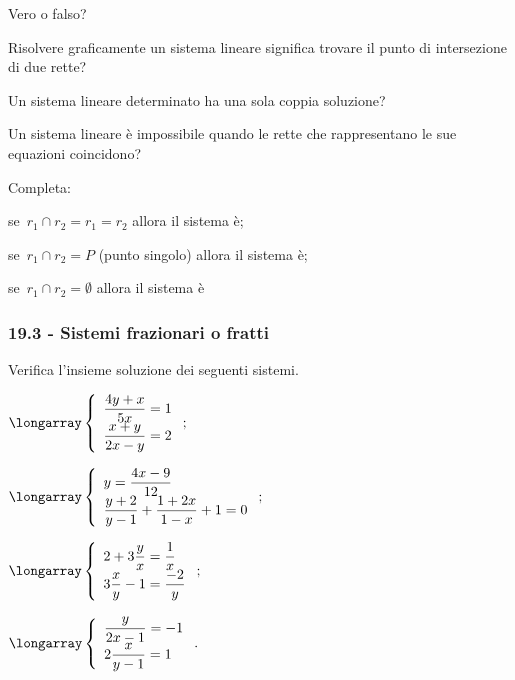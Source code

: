 \begin{esercizio}
 \label{ese:19.44}
Vero o falso?
\TabPositions{11cm}
 \begin{enumeratea}
\item Risolvere graficamente un sistema lineare significa trovare il punto di intersezione di due rette? \tab\boxV\quad\boxF
\item Un sistema lineare determinato ha una sola coppia soluzione?\tab\boxV\quad\boxF
\item Un sistema lineare è impossibile quando le rette che rappresentano le sue equazioni coincidono?\tab\boxV\quad\boxF
\end{enumeratea}
\end{esercizio}

\begin{esercizio}
 \label{ese:19.45}
Completa:

\begin{itemize*}
\item se~$r_{1}\cap r_{2}=r_{1}=r_{2}$ allora il sistema è\dotfill;
\item se~$r_{1}\cap r_{2}=P$ (punto singolo) allora il sistema è\dotfill;
\item se~$r_{1}\cap r_{2}=\emptyset $ allora il sistema è\dotfill
\end{itemize*}
\end{esercizio}
\pagebreak
\subsubsection*{19.3 - Sistemi frazionari o fratti}

\begin{esercizio}[\Ast]
 \label{ese:19.46}
Verifica l'insieme soluzione dei seguenti sistemi.
\begin{multicols}{2}
\begin{enumeratea}
\item $\longarray\left\{\begin{array}{l}\dfrac{4y+x}{5x}=1\\\dfrac{x+y}{2x-y}=2\end{array}\right.;$
\item $\longarray\left\{\begin{array}{l}y=\dfrac{4x-9}{12}\\{\dfrac{y+2}{y-1}+\dfrac{1+2x}{1-x}+1=0}\end{array}\right.;$
\item $\longarray\left\{\begin{array}{l}2+3\dfrac{y}{x}=\dfrac{1}{x}\\3\dfrac{x}{y}-1=\dfrac{-2}{y} \end{array}\right.;$
\item $\longarray\left\{\begin{array}{l}\dfrac{y}{2x-1}=-1\\2\dfrac{x}{y-1}=1\end{array}\right..$
\end{enumeratea}
\end{multicols}
\end{esercizio}


